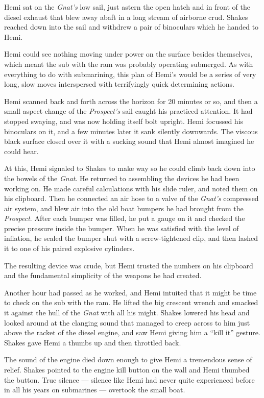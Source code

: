 \documentclass[]{scrbook}
\begin{document}
Hemi sat on the \emph{Gnat's} low sail, just astern the open hatch and
in front of the diesel exhaust that blew away abaft in a long stream of
airborne crud. Shakes reached down into the sail and withdrew a pair of
binoculars which he handed to Hemi.

Hemi could see nothing moving under power on the surface besides
themselves, which meant the sub with the ram was probably operating
submerged. As with everything to do with submarining, this plan of
Hemi's would be a series of very long, slow moves interspersed with
terrifyingly quick determining actions.

Hemi scanned back and forth across the horizon for 20 minutes or so, and
then a small aspect change of the \emph{Prospect's} sail caught his
practiced attention. It had stopped swaying, and was now holding itself
bolt upright. Hemi focussed his binoculars on it, and a few minutes
later it sank silently downwards. The viscous black surface closed over
it with a sucking sound that Hemi almost imagined he could hear.

At this, Hemi signaled to Shakes to make way so he could climb back down
into the bowels of the \emph{Gnat}. He returned to assembling the
devices he had been working on. He made careful calculations with his
slide ruler, and noted them on his clipboard. Then he connected an air
hose to a valve of the \emph{Gnat's} compressed air system, and blew air
into the old boat bumpers he had brought from the \emph{Prospect}. After
each bumper was filled, he put a gauge on it and checked the precise
pressure inside the bumper. When he was satisfied with the level of
inflation, he sealed the bumper shut with a screw-tightened clip, and
then lashed it to one of his paired explosive cylinders.

The resulting device was crude, but Hemi trusted the numbers on his
clipboard and the fundamental simplicity of the weapons he had created.

Another hour had passed as he worked, and Hemi intuited that it might be
time to check on the sub with the ram. He lifted the big crescent wrench
and smacked it against the hull of the \emph{Gnat} with all his might.
Shakes lowered his head and looked around at the clanging sound that
managed to creep across to him just above the racket of the diesel
engine, and saw Hemi giving him a ``kill it'' gesture. Shakes gave Hemi
a thumbs up and then throttled back.

The sound of the engine died down enough to give Hemi a tremendous sense
of relief. Shakes pointed to the engine kill button on the wall and Hemi
thumbed the button. True silence --- silence like Hemi had never quite
experienced before in all his years on submarines --- overtook the small
boat.
\end{document}
